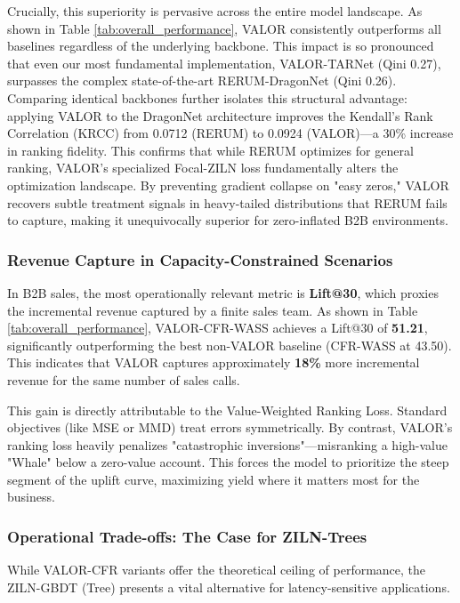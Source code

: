 \documentclass[runningheads]{llncs}
\begin{document}
Crucially, this superiority is pervasive across the entire model landscape. As shown in Table \ref{tab:overall_performance}, VALOR consistently outperforms all baselines regardless of the underlying backbone. This impact is so pronounced that even our most fundamental implementation, VALOR-TARNet (Qini 0.27), surpasses the complex state-of-the-art RERUM-DragonNet (Qini 0.26). Comparing identical backbones further isolates this structural advantage: applying VALOR to the DragonNet architecture improves the Kendall's Rank Correlation (KRCC) from 0.0712 (RERUM) to 0.0924 (VALOR)—a 30\% increase in ranking fidelity. This confirms that while RERUM\cite{rerum2024} optimizes for general ranking, VALOR's specialized Focal-ZILN loss fundamentally alters the optimization landscape. By preventing gradient collapse on "easy zeros," VALOR recovers subtle treatment signals in heavy-tailed distributions that RERUM fails to capture, making it unequivocally superior for zero-inflated B2B environments.

\subsubsection{Revenue Capture in Capacity-Constrained Scenarios}
In B2B sales, the most operationally relevant metric is \textbf{Lift@30}, which proxies the incremental revenue captured by a finite sales team.
As shown in Table \ref{tab:overall_performance}, VALOR-CFR-WASS achieves a Lift@30 of \textbf{51.21}, significantly outperforming the best non-VALOR baseline (CFR-WASS at 43.50). This indicates that VALOR captures approximately \textbf{18\%} more incremental revenue for the same number of sales calls.

This gain is directly attributable to the Value-Weighted Ranking Loss. Standard objectives (like MSE or MMD) treat errors symmetrically. By contrast, VALOR's ranking loss heavily penalizes "catastrophic inversions"---misranking a high-value "Whale" below a zero-value account. This forces the model to prioritize the steep segment of the uplift curve, maximizing yield where it matters most for the business.

\subsubsection{Operational Trade-offs: The Case for ZILN-Trees}
While VALOR-CFR variants offer the theoretical ceiling of performance, the ZILN-GBDT (Tree) presents a vital alternative for latency-sensitive applications.
\end{document}
